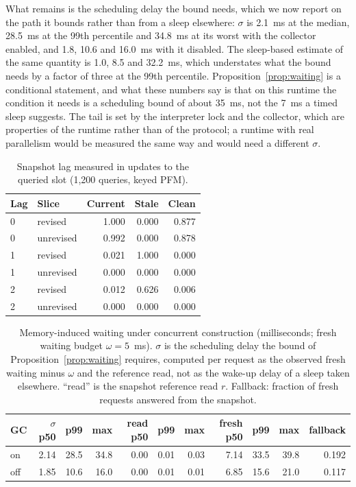 \documentclass{article} %
\begin{document}
What remains is the scheduling delay the bound needs, which we now report on the path it bounds rather than from a sleep elsewhere: $\sigma$ is 2.1~ms at the median, 28.5~ms at the 99th percentile and 34.8~ms at its worst with the collector enabled, and 1.8, 10.6 and 16.0~ms with it disabled. The sleep-based estimate of the same quantity is 1.0, 8.5 and 32.2~ms, which understates what the bound needs by a factor of three at the 99th percentile. Proposition~\ref{prop:waiting} is a conditional statement, and what these numbers say is that on this runtime the condition it needs is a scheduling bound of about 35~ms, not the 7~ms a timed sleep suggests. The tail is set by the interpreter lock and the collector, which are properties of the runtime rather than of the protocol; a runtime with real parallelism would be measured the same way and would need a different $\sigma$.

\begin{table}[h]
\centering
\small
\begin{tabular}{@{}llrrr@{}}
\toprule
Lag & Slice & Current & Stale & Clean \\
\midrule
0 & revised & 1.000 & 0.000 & 0.877 \\
0 & unrevised & 0.992 & 0.000 & 0.878 \\
1 & revised & 0.021 & 1.000 & 0.000 \\
1 & unrevised & 0.000 & 0.000 & 0.000 \\
2 & revised & 0.012 & 0.626 & 0.006 \\
2 & unrevised & 0.000 & 0.000 & 0.000 \\
\bottomrule
\end{tabular}
\caption{Snapshot lag measured in updates to the queried slot (1{,}200 queries, keyed PFM).}
\label{tab:lag}
\end{table}

\begin{table}[h]
\centering
\scriptsize
\setlength{\tabcolsep}{3pt}
\begin{tabular}{@{}lrrrrrrrrrr@{}}
\toprule
GC & $\sigma$ p50 & p99 & max & read p50 & p99 & max & fresh p50 & p99 & max & fallback \\
\midrule
on & 2.14 & 28.5 & 34.8 & 0.00 & 0.01 & 0.03 & 7.14 & 33.5 & 39.8 & 0.192 \\
off & 1.85 & 10.6 & 16.0 & 0.00 & 0.01 & 0.01 & 6.85 & 15.6 & 21.0 & 0.117 \\
\bottomrule
\end{tabular}
\caption{Memory-induced waiting under concurrent construction (milliseconds; fresh waiting budget $\omega=5$~ms). $\sigma$ is the scheduling delay the bound of Proposition~\ref{prop:waiting} requires, computed per request as the observed fresh waiting minus $\omega$ and the reference read, not as the wake-up delay of a sleep taken elsewhere. ``read'' is the snapshot reference read $r$. Fallback: fraction of fresh requests answered from the snapshot.}
\label{tab:load}
\end{table}
\end{document}
